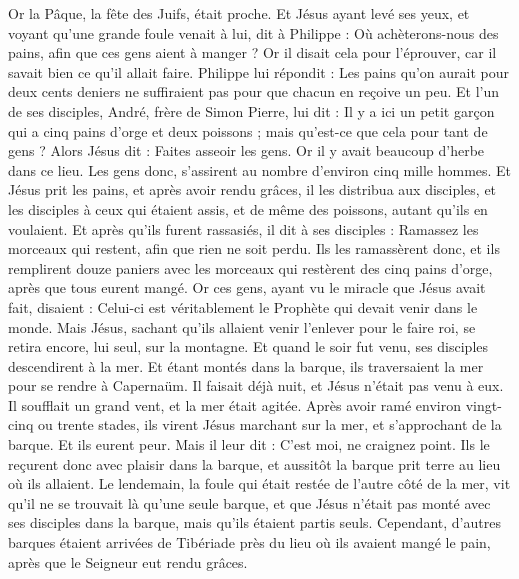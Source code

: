\begin{multicols}{2}
Or la Pâque, la fête des Juifs, était proche.
Et Jésus ayant levé ses yeux, et voyant qu'une grande foule venait à lui, dit à Philippe : Où achèterons-nous des pains, afin que ces gens aient à manger ?
Or il disait cela pour l'éprouver, car il savait bien ce qu'il allait faire.
Philippe lui répondit : Les pains qu'on aurait pour deux cents deniers ne suffiraient pas pour que chacun en reçoive un peu.
Et l'un de ses disciples, André, frère de Simon Pierre, lui dit :
Il y a ici un petit garçon qui a cinq pains d'orge et deux poissons ; mais qu'est-ce que cela pour tant de gens ?
Alors Jésus dit : Faites asseoir les gens. Or il y avait beaucoup d'herbe dans ce lieu. Les gens donc, s'assirent au nombre d'environ cinq mille hommes.
Et Jésus prit les pains, et après avoir rendu grâces, il les distribua aux disciples, et les disciples à ceux qui étaient assis, et de même des poissons, autant qu'ils en voulaient.
Et après qu'ils furent rassasiés, il dit à ses disciples : Ramassez les morceaux qui restent, afin que rien ne soit perdu.
Ils les ramassèrent donc, et ils remplirent douze paniers avec les morceaux qui restèrent des cinq pains d'orge, après que tous eurent mangé.
Or ces gens, ayant vu le miracle que Jésus avait fait, disaient : Celui-ci est véritablement le Prophète qui devait venir dans le monde.
Mais Jésus, sachant qu'ils allaient venir l'enlever pour le faire roi, se retira encore, lui seul, sur la montagne.
Et quand le soir fut venu, ses disciples descendirent à la mer.
Et étant montés dans la barque, ils traversaient la mer pour se rendre à Capernaüm. Il faisait déjà nuit, et Jésus n'était pas venu à eux.
Il soufflait un grand vent, et la mer était agitée.
Après avoir ramé environ vingt-cinq ou trente stades, ils virent Jésus marchant sur la mer, et s'approchant de la barque. Et ils eurent peur.
Mais il leur dit : C'est moi, ne craignez point.
Ils le reçurent donc avec plaisir dans la barque, et aussitôt la barque prit terre au lieu où ils allaient.
Le lendemain, la foule qui était restée de l'autre côté de la mer, vit qu'il ne se trouvait là qu'une seule barque, et que Jésus n'était pas monté avec ses disciples dans la barque, mais qu'ils étaient partis seuls.
Cependant, d'autres barques étaient arrivées de Tibériade près du lieu où ils avaient mangé le pain, après que le Seigneur eut rendu grâces.

\end{multicols}
